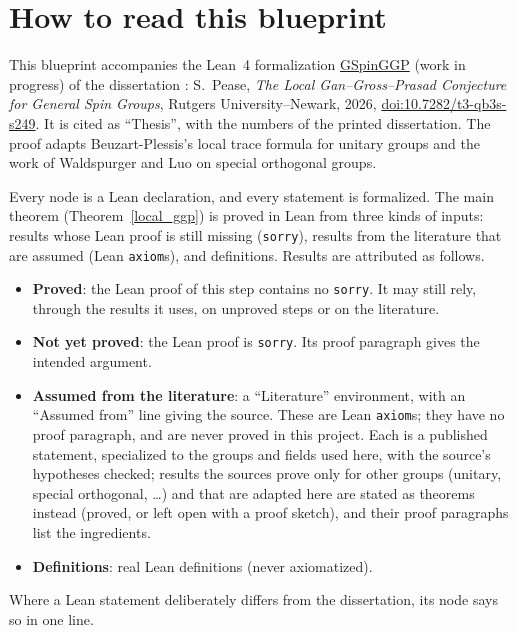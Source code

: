 %

\chapter*{How to read this blueprint}

This blueprint accompanies the Lean~4 formalization
\href{https://github.com/SamPease/GSpinGGP}{GSpinGGP} (work in progress) of the dissertation
\cite{Thesis}: S.~Pease, \emph{The Local Gan--Gross--Prasad Conjecture for General Spin Groups},
Rutgers University--Newark, 2026, \href{https://doi.org/10.7282/t3-qb3s-s249}{doi:10.7282/t3-qb3s-s249}.
It is cited as ``Thesis'', with the numbers of the printed dissertation. The proof adapts
Beuzart-Plessis's local trace formula for unitary groups \cite{BP} and the work of Waldspurger
\cite{Wal10} and Luo \cite{Luo} on special orthogonal groups.

Every node is a Lean declaration, and every statement is formalized. The main theorem
(Theorem~\ref{local_ggp}) is proved in Lean from three kinds of inputs: results whose Lean proof is
still missing (\texttt{sorry}), results from the literature that are assumed (Lean \texttt{axiom}s),
and definitions. Results are attributed as follows.
\begin{itemize}
  \item \textbf{Proved}: the Lean proof of this step contains no \texttt{sorry}. It may still rely,
    through the results it uses, on unproved steps or on the literature.
  \item \textbf{Not yet proved}: the Lean proof is \texttt{sorry}. Its proof paragraph gives the
    intended argument.
  \item \textbf{Assumed from the literature}: a ``Literature'' environment, with an
    ``Assumed from'' line giving the source. These are Lean \texttt{axiom}s; they have no proof
    paragraph, and are never proved in this project. Each is a published statement, specialized to the groups and
    fields used here, with the source's hypotheses checked; results the sources prove only for other groups
    (unitary, special orthogonal, \dots) and that are adapted here are stated as theorems instead (proved, or
    left open with a proof sketch), and their proof paragraphs list the ingredients.
  \item \textbf{Definitions}: real Lean definitions (never axiomatized).
\end{itemize}
Where a Lean statement deliberately differs from the dissertation, its node says so in one line.

